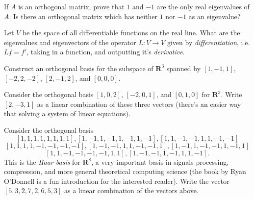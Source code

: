 \documentclass[12pt,a4paper]{article}
\theoremstyle{definition}
\begin{document}
\begin{questions}
\begin{question}
	If $A$ is an orthogonal matrix, prove that $1$ and $-1$ are the only real eigenvalues of $A$. Is there an orthogonal matrix which has neither $1$ nor $-1$ as an eigenvalue?
\end{question}

\begin{question}
	Let $V$ be the space of all differentiable functions on the real line. What are the eigenvalues and eigenvectors of the operator $L: V \to V$ given by \emph{differentiation}, i.e. $Lf = f'$, taking in a function, and outputting it's \emph{derivative}.
\end{question}

\begin{question}
	Construct an orthogonal basis for the subspace of $\mathbf{R}^3$ spanned by $[1, -1, 1]$, $[-2, 2, -2]$, $[2,-1,2]$, and $[0,0,0]$.
\end{question}

\begin{question}
	Consider the orthogonal basis $[1,0,2]$, $[-2,0,1]$, and $[0,1,0]$ for $\mathbf{R}^3$. Write $[2, -3, 1]$ as a linear combination of these three vectors (there's an easier way that solving a system of linear equations).
\end{question}

\begin{question}
	Consider the orthogonal basis
\[ [1,1,1,1,1,1,1,1], [1,-1,1,-1,1,-1,1,-1], [1,1,-1,-1,1,1,-1,-1] \]
\[ [1,1,1,1,-1,-1,-1,-1], [1,-1,-1,1,1,-1,-1,1], [1,-1,1,-1,-1,1,-1,1] \]
\[ [1,1,-1,-1,-1,-1,1,1], [1,-1,-1,1,-1,1,1,-1]. \]
%
This is the \emph{Haar basis} for $\mathbf{R}^8$, a very important basis in signals processing, compression, and more general theoretical computing science (the book by Ryan O'Donnell is a fun introduction for the interested reader). Write the vector $[5,3,2,7,2,6,5,3]$ as a linear combination of the vectors above.
\end{question}



\end{questions}	
\end{document}
